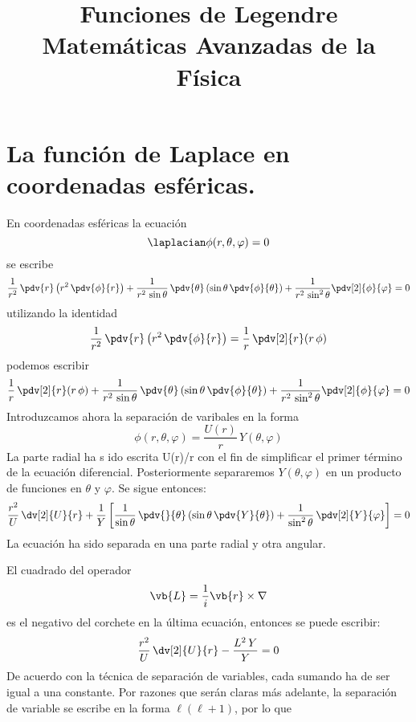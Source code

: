 

\title{Funciones de Legendre \\ {\large Matemáticas Avanzadas de la Física}}
\date{ }

\maketitle
\fontsize{14}{14}\selectfont
\section{La función de Laplace en coordenadas esféricas.}
En coordenadas esféricas la ecuación
\[ \laplacian \phi (r, \theta, \varphi) = 0 \]
se escribe
\[ \dfrac{1}{r^{2}} \, \pdv{r} \left( r^{2} \, \pdv{\phi}{r} \right) + \dfrac{1}{r^{2} \, \sin \theta} \, \pdv{\theta} \left( \sin \theta \, \pdv{\phi}{\theta} \right) + \dfrac{1}{r^{2} \, \sin^{2} \theta} \pdv[2]{\phi}{\varphi} = 0 \]
utilizando la identidad
\[ \dfrac{1}{r^{2}} \, \pdv{r} \left( r^{2} \, \pdv{\phi}{r} \right) = \dfrac{1}{r} \, \pdv[2]{r} (r \, \phi) \]
podemos escribir
\[ \dfrac{1}{r} \, \pdv[2]{r} (r \, \phi) + \dfrac{1}{r^{2} \, \sin \theta} \, \pdv{\theta} \left( \sin \theta \, \pdv{\phi}{\theta} \right) + \dfrac{1}{r^{2} \, \sin^{2} \theta} \pdv[2]{\phi}{\varphi} = 0 \]
Introduzcamos ahora la separación de varibales en la forma
\[ \phi (r, \theta, \varphi) =  \dfrac{U(r)}{r} \, Y(\theta, \varphi) \]
La parte radial ha s    ido escrita U(r)/r con el fin de simplificar el primer término de la ecuación diferencial. Posteriormente separaremos $Y(\theta, \varphi)$ en un producto de funciones en $\theta$ y $\varphi$. Se sigue entonces:
\[ \dfrac{r^{2}}{U} \, \dv[2]{U}{r} + \dfrac{1}{Y} \left[ \dfrac{1}{\sin \theta} \, \pdv{}{\theta} \left( \sin \theta \, \pdv{Y}{\theta} \right) + \dfrac{1}{\sin^{2} \theta} \, \pdv[2]{Y}{\varphi} \right] = 0 \]
La ecuación ha sido separada en una parte radial y otra angular.
\par
El cuadrado del operador
\[ \vb{L} = \dfrac{1}{i} \vb{r} \times \nabla \]
es el negativo del corchete en la última ecuación, entonces se puede escribir:
\[ \dfrac{r^{2}}{U} \, \dv[2]{U}{r} - \dfrac{L^{2} \, Y}{Y} = 0 \]
De acuerdo con la técnica de separación de variables, cada sumando ha de ser igual a una constante. Por razones que serán claras más adelante, la separación de variable se escribe en la forma $\ell (\ell + 1)$, por lo que
